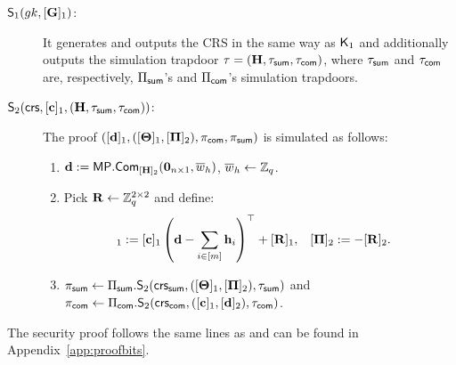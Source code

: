 \begin{description}
%
\item[{$\mathsf{S}_1({gk},[\mathbf{{G}}]_1)$}:] It generates and outputs the CRS in the same way as $\mathsf{K}_1$ and additionally outputs the simulation trapdoor 
$\tau=\left(\mathbf{{H}},\tau_{\mathsf{sum}}, \tau_{\mathsf{com}}\right)$,
where $\tau_{\mathsf{sum}}$ and $\tau_{\mathsf{com}}$ are, respectively, $\Pi_{\mathsf{sum}}$'s and $\Pi_{\mathsf{com}}$'s simulation trapdoors.
\item[{$\mathsf{S}_2(\mathsf{crs},[\mathbf{c}]_1,\left(\mathbf{{H}},\tau_{\mathsf{sum}}, \tau_{\mathsf{com}}\right))$}:] The proof $([\mathbf{d}]_1,([\mathbf{{\Theta}}]_1,[\mathbf{{\Pi}}]_2),\pi_{\mathsf{com}},\pi_{\mathsf{sum}})$ is simulated as follows:
\begin{enumerate}
\item $\mathbf{d}:= \mathsf{MP}.\mathsf{Com}_{[\mathbf{{H}}]_2}(\mathbf{0}_{n\times1},\overline{w}_h)$, $\overline{w}_h \gets \mathbb{Z}_q$.
\item Pick $\mathbf{{R}} \gets \mathbb{Z}_q^{2 \times 2}$ and define:
\begin{align*} 
[\matr{\Theta}]_1 & :=  [\vecb{c}]_1\left(\vecb{d}-\sum_{i \in [m]} \lrck_i\right)^\top + [\matr{R}]_1,
    &
[\matr{\Pi}]_2 & := - [\matr{R}]_2.
\end{align*}
\item $\pi_{\mathsf{sum}}\gets\Pi_{\mathsf{sum}}.\mathsf{S}_2(\mathsf{crs}_{\mathsf{sum}},([\mathbf{{\Theta}}]_1,[\mathbf{{\Pi}}]_2),\tau_{\mathsf{sum}})$ and $\pi_{\mathsf{com}}\gets\Pi_{\mathsf{com}}.\mathsf{S}_2(\mathsf{crs}_{\mathsf{com}},([\mathbf{c}]_1,[\mathbf{d}]_2),\tau_{\mathsf{com}})$.
\end{enumerate}
\end{description}

The security proof follows the same lines as \cite{AC:GonHevRaf15} and can be found in Appendix~\ref{app:proofbits}.


